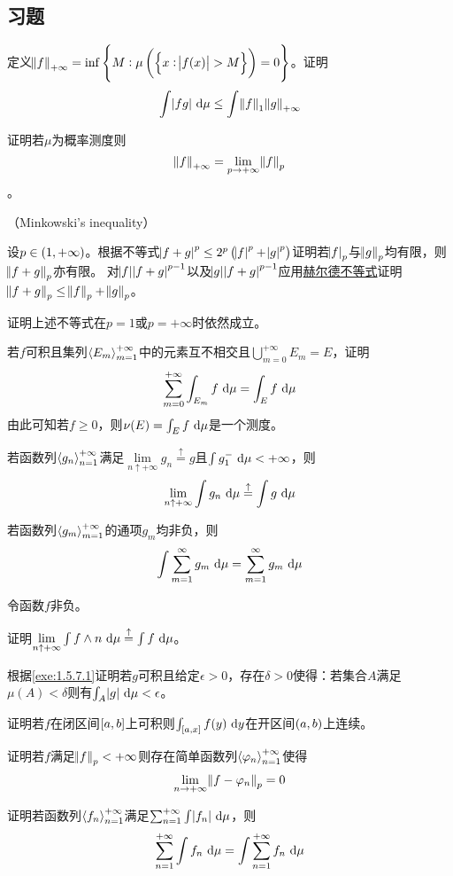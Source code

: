 \documentclass[../main.tex]{subfiles}
\begin{document}
\subsection*{习题}
\begin{exercise}
	\item 定义\(\enVert{f}_{+\infty}=\inf\cbr{M:\mu\del{\cbr{x:\envert{f(x)}>M}}=0}\)。证明
	\[\int\envert{fg}\,\dif\mu\leq\int\enVert{f}_1\enVert{g}_{+\infty}\]
	\item 证明若\(\mu\)为概率测度则
	\[\enVert{f}_{+\infty}=\lim\limits_{p\rightarrow+\infty}\enVert{f}_p\]。
	\item {}（Minkowski’s inequality）
	\begin{exercise}
		\item 设\(p\in\intoo{1,+\infty}\)。根据不等式\(\envert{f+g}^p\leq2^p\del{\envert{f}^p+\envert{g}^p}\)证明若\(\envert{f}_p\)与\(\enVert{g}_p\)均有限，则\(\enVert{f+g}_p\)亦有限。
		 对\(\envert{f}\envert{f+g}^{p-1}\)以及\(\envert{g}\envert{f+g}^{p-1}\)应用\hyperref[thm:1.5.2]{赫尔德不等式}证明\(\enVert{f+g}_p\leq\enVert{f}_p+\enVert{g}_p\)。
		\item 证明上述不等式在\(p=1\)或\(p=+\infty\)时依然成立。
	\end{exercise}
	\item\label{exe:1.5.4} 若\(f\)可积且集列\(\left<E_m\right>^{+\infty}_{m=1}\)中的元素互不相交且\(\bigcup_{m=0}^{+\infty} E_m=E\)，证明
	\[\sum_{m=0}^{+\infty}\int_{E_m}f\,\dif\mu=\int_Ef\,\dif\mu\]
	由此可知若\(f\geq0\)，则\(\nu(E)=\int_{E}f\,\dif\mu\)是一个测度。
	\item 若函数列\(\left<g_n\right>^{+\infty}_{n=1}\)满足\(\lim\limits_{n\uparrow+\infty}g_n\stackrel{\uparrow}{=}g\)且\(\int g_1^-\,\dif\mu<+\infty\)，则
	\[\lim\limits_{n\uparrow+\infty}\int g_n\,\dif\mu\stackrel{\uparrow}{=}\int g\,\dif\mu\]
	\item 若函数列\(\left<g_m\right>^{+\infty}_{m=1}\)的通项\(g_m\)均非负，则\[\int\sum_{m=1}^\infty g_m\,\dif\mu=\sum_{m=1}^\infty g_m\,\dif\mu\]
	\item 令函数\(f\)非负。
	\begin{exercise}
		\item \label{exe:1.5.7.1}证明\(\lim\limits_{n\uparrow+\infty}\int f\wedge n\,\dif\mu\stackrel{\uparrow}{=}\int f\,\dif\mu\)。
		\item 根据\ref{exe:1.5.7.1}证明若\(g\)可积且给定\(\epsilon>0\)，存在\(\delta>0\)使得：若集合\(A\)满足\(\mu(A)<\delta\)则有\(\int_A\envert{g}\,\dif\mu<\epsilon\)。
	\end{exercise}
	\item 证明若\(f\)在闭区间\(\intcc{a,b}\)上可积则\(\int_{\intcc{a,x}}f(y)\,\dif y\)在开区间\(\intoo{a,b}\)上连续。
	\item 证明若\(f\)满足\(\enVert{f}_p<+\infty\)则存在简单函数列\(\left<\varphi_n\right>^{+\infty}_{n=1}\)使得
	\[\lim\limits_{n\rightarrow+\infty}\enVert{f-\varphi_n}_p=0\]
	\item 证明若函数列\(\left<f_n\right>^{+\infty}_{n=1}\)满足\(\sum_{n=1}^{+\infty}\int\envert{f_n}\,\dif\mu\)，则
	\[\sum_{n=1}^{+\infty}\int f_n\,\dif\mu=\int\sum_{n=1}^{+\infty}f_n\,\dif\mu\]
\end{exercise}
\end{document}
